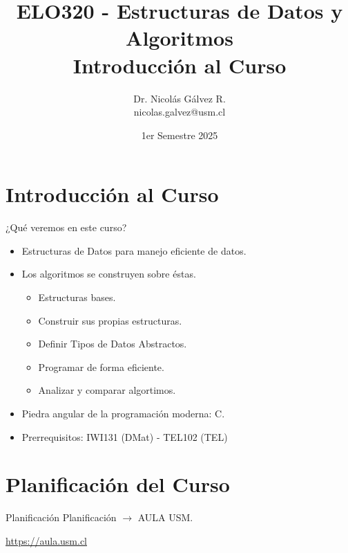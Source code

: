 \documentclass{beamer}
\title{ELO320 - Estructuras de Datos y Algoritmos\\Introducción al Curso}
\author{Dr. Nicolás Gálvez R.\\{\small nicolas.galvez@usm.cl}}
\institute{Ing. Civil Telemática - Departamento de Electrónica}
\date{1er Semestre 2025}
\begin{document}
\frame{\titlepage}


\section{Introducción al Curso}
\begin{frame}{¿Qué veremos en este curso?}
\begin{itemize}
\item Estructuras de Datos para manejo eficiente de datos.
\item Los algoritmos se construyen sobre éstas.
\begin{itemize}
	\item Estructuras bases.
	\item Construir sus propias estructuras.
	\item Definir Tipos de Datos Abstractos. 
	\item Programar de forma eficiente.
	\item Analizar y comparar algortimos.
\end{itemize}
\item Piedra angular de la programación moderna: C. 
\item Prerrequisitos: IWI131 (DMat) - TEL102 (TEL)
\end{itemize}
\end{frame}

\section{Planificación del Curso}
\begin{frame}{Planificación}
Planificación $\rightarrow$ AULA USM.

{\Large\begin{center}\url{https://aula.usm.cl}\end{center}}
\end{frame}
\end{document}
